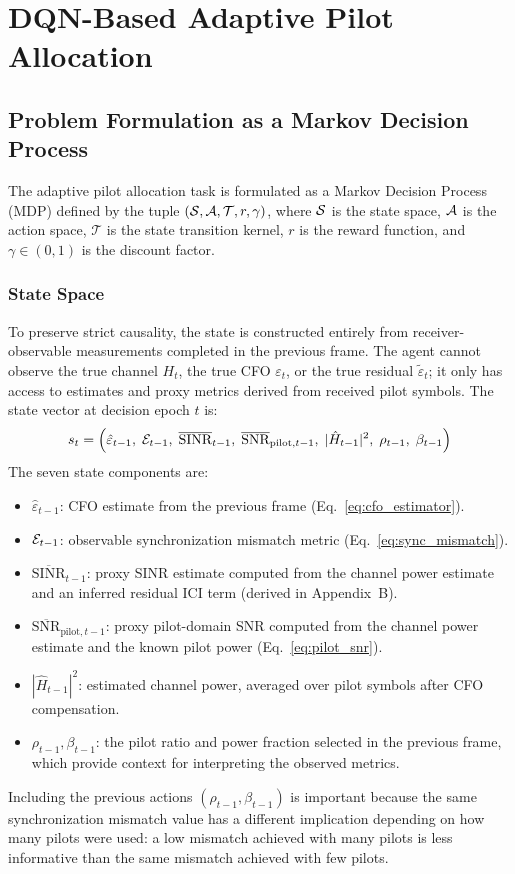 \chapter{DQN-Based Adaptive Pilot Allocation}

\section{Problem Formulation as a Markov Decision Process}

The adaptive pilot allocation task is formulated as a Markov Decision Process (MDP) defined by the tuple $(\mathcal{S}, \mathcal{A}, \mathcal{T}, r, \gamma)$, where $\mathcal{S}$ is the state space, $\mathcal{A}$ is the action space, $\mathcal{T}$ is the state transition kernel, $r$ is the reward function, and $\gamma \in (0,1)$ is the discount factor.

\subsection{State Space}

To preserve strict causality, the state is constructed entirely from receiver-observable measurements completed in the previous frame. The agent cannot observe the true channel $H_t$, the true CFO $\varepsilon_t$, or the true residual $\tilde{\varepsilon}_t$; it only has access to estimates and proxy metrics derived from received pilot symbols. The state vector at decision epoch $t$ is:
\begin{equation}
    s_t = \left(\hat{\varepsilon}_{t-1},\; \mathcal{E}_{t-1},\; \overline{\text{SINR}}_{t-1},\; \overline{\text{SNR}}_{\text{pilot},t-1},\; |\hat{H}_{t-1}|^2,\; \rho_{t-1},\; \beta_{t-1}\right)
    \label{eq:state_vector}
\end{equation}
The seven state components are:
\begin{itemize}
    \item $\hat{\varepsilon}_{t-1}$: CFO estimate from the previous frame (Eq.~\ref{eq:cfo_estimator}).
    \item $\mathcal{E}_{t-1}$: observable synchronization mismatch metric (Eq.~\ref{eq:sync_mismatch}).
    \item $\overline{\text{SINR}}_{t-1}$: proxy SINR estimate computed from the channel power estimate and an inferred residual ICI term (derived in Appendix~B).
    \item $\overline{\text{SNR}}_{\text{pilot},t-1}$: proxy pilot-domain SNR computed from the channel power estimate and the known pilot power (Eq.~\ref{eq:pilot_snr}).
    \item $|\hat{H}_{t-1}|^2$: estimated channel power, averaged over pilot symbols after CFO compensation.
    \item $\rho_{t-1}, \beta_{t-1}$: the pilot ratio and power fraction selected in the previous frame, which provide context for interpreting the observed metrics.
\end{itemize}
Including the previous actions $(\rho_{t-1}, \beta_{t-1})$ is important because the same synchronization mismatch value has a different implication depending on how many pilots were used: a low mismatch achieved with many pilots is less informative than the same mismatch achieved with few pilots.

